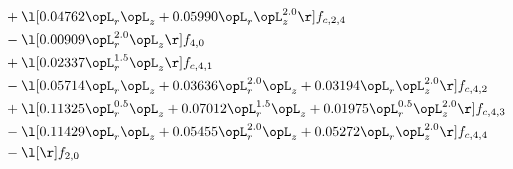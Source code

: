 \begin{alignat}{2}
& + \l[  0.04762 \opL_r \opL_z +  0.05990 \opL_r \opL_z^{2.0}  \r] f_{c,2,4} \nonumber \\ 
& - \l[  0.00909 \opL_r^{2.0} \opL_z  \r] f_{4,0} \nonumber \\ 
& + \l[  0.02337 \opL_r^{1.5} \opL_z  \r] f_{c,4,1} \nonumber \\ 
& - \l[  0.05714 \opL_r \opL_z +  0.03636 \opL_r^{2.0} \opL_z +  0.03194 \opL_r \opL_z^{2.0}  \r] f_{c,4,2} \nonumber \\ 
& + \l[  0.11325 \opL_r^{0.5} \opL_z +  0.07012 \opL_r^{1.5} \opL_z +  0.01975 \opL_r^{0.5} \opL_z^{2.0}  \r] f_{c,4,3} \nonumber \\ 
& - \l[  0.11429 \opL_r \opL_z +  0.05455 \opL_r^{2.0} \opL_z +  0.05272 \opL_r \opL_z^{2.0}  \r] f_{c,4,4} \nonumber \\ 
& - \l[  \r] f_{2,0} \nonumber \\ 
\end{alignat} 


